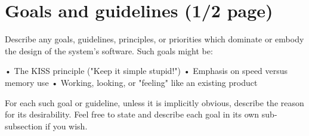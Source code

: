 \section{Goals and guidelines (1/2 page)}

Describe any goals, guidelines, principles, or priorities which dominate or embody the design of the system's software. Such goals might be:

    • The KISS principle ("Keep it simple stupid!")
    • Emphasis on speed versus memory use
    • Working, looking, or "feeling" like an existing product

For each such goal or guideline, unless it is implicitly obvious, describe the reason for its desirability. Feel free to state and describe each goal in its own sub-subsection if you wish.
